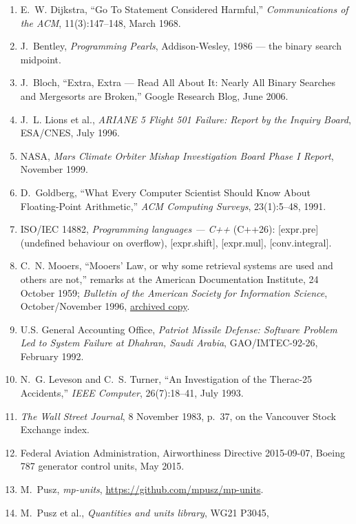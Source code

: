 \documentclass[11pt,a4paper]{article}
\begin{document}
\begin{enumerate}[leftmargin=1.8em]
\item E.~W. Dijkstra, ``Go To Statement Considered Harmful,''
      \emph{Communications of the ACM}, 11(3):147--148, March 1968.
\item J.~Bentley, \emph{Programming Pearls}, Addison-Wesley, 1986 --- the
      binary search midpoint.
\item J.~Bloch, ``Extra, Extra --- Read All About It: Nearly All Binary
      Searches and Mergesorts are Broken,'' Google Research Blog, June 2006.
\item J.~L. Lions et al., \emph{ARIANE 5 Flight 501 Failure: Report by the
      Inquiry Board}, ESA/CNES, July 1996.
\item NASA, \emph{Mars Climate Orbiter Mishap Investigation Board Phase I
      Report}, November 1999.
\item D.~Goldberg, ``What Every Computer Scientist Should Know About
      Floating-Point Arithmetic,'' \emph{ACM Computing Surveys},
      23(1):5--48, 1991.
\item ISO/IEC 14882, \emph{Programming languages --- C++} (C++26):
      [expr.pre] (undefined behaviour on overflow), [expr.shift],
      [expr.mul], [conv.integral].
\item C.~N. Mooers, ``Mooers' Law, or why some retrieval systems are used and
      others are not,'' remarks at the American Documentation Institute,
      24 October 1959; \emph{Bulletin of the American Society for Information
      Science}, October/November 1996,
      \href{https://web.archive.org/web/20110608152902/http://findarticles.com/p/articles/mi_qa3633/is_199610/ai_n8749122/}{archived copy}.
\item U.S. General Accounting Office, \emph{Patriot Missile Defense: Software
      Problem Led to System Failure at Dhahran, Saudi Arabia},
      GAO/IMTEC-92-26, February 1992.
\item N.~G. Leveson and C.~S. Turner, ``An Investigation of the Therac-25
      Accidents,'' \emph{IEEE Computer}, 26(7):18--41, July 1993.
\item \emph{The Wall Street Journal}, 8 November 1983, p.~37, on the Vancouver
      Stock Exchange index.
\item Federal Aviation Administration, Airworthiness Directive 2015-09-07,
      Boeing 787 generator control units, May 2015.
\item M.~Pusz, \emph{mp-units}, \url{https://github.com/mpusz/mp-units}.
\item M.~Pusz et al., \emph{Quantities and units library}, WG21 P3045,

\end{enumerate}
\end{document}
